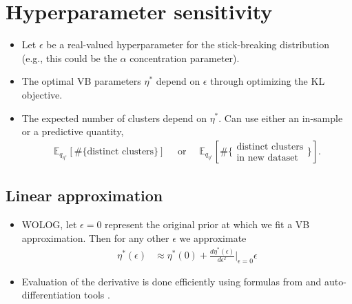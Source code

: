 \documentclass[a0,plainsections,30pt]{sciposter}\usepackage[]{graphicx}\usepackage[]{color}
\newcommand{\Expect}{\mathbb{E}}
\begin{document}
\begin{minipage}[t]{0.45\textwidth}
\section*{Hyperparameter sensitivity}
\vspace{-0.3in}

\begin{itemize}

\item Let $\epsilon$ be a real-valued hyperparameter for the stick-breaking distribution
(e.g., this could be the $\alpha$ concentration parameter).

\item The optimal VB parameters $\eta^*$ depend on $\epsilon$ through optimizing the KL objective.

\item The expected number of clusters depend on $\eta^*$. Can use either an in-sample or a predictive quantity,
\vspace{-0.1in}
\begin{align}
\Expect_{q_{\eta^*}} \left[ \#\{\text{distinct clusters}\} \right]
\quad \text{ or } \quad
\Expect_{q_{\eta^*}}
\left[\#\{\substack{\text{distinct clusters}\\\text{in new dataset}}\} \right].
\end{align}
\end{itemize}

\vspace{-0.9in}
\subsection*{Linear approximation}
\vspace{-0.2in}
\begin{itemize}
\item WOLOG, let $\epsilon=0$ represent the original prior at which we fit a VB approximation. Then for any other $\epsilon$ we approximate
\begin{align}
\eta^*(\epsilon)  &\approx  \eta^*(0) +
\frac{d \eta^*(\epsilon)}{d\epsilon^T}\Big|_{\epsilon=0} \epsilon
\label{eq:linear_approx}
\end{align}

\item Evaluation of the derivative is done efficiently using formulas from \cite{giordano:2017:covariances} and auto-differentiation tools \cite{maclaurin:2015:autograd}.


\end{itemize}
\end{minipage}
\end{document}

